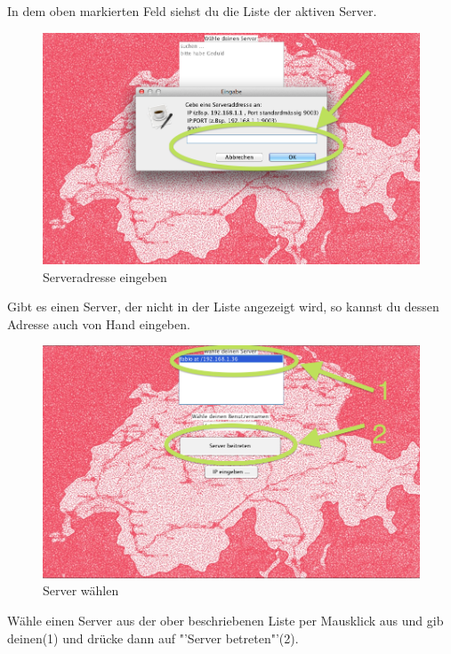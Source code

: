 \documentclass[ngerman, 12pt, pdftex]{scrartcl}[2006/07/30]
\begin{document}
In dem oben markierten Feld siehst du die Liste der aktiven Server.

\newpage 

\begin{figure}[h]
\centering
\includegraphics[scale=0.3]{starten/IP_manuell_eingeben.png}
\caption{Serveradresse eingeben}
\end{figure}

Gibt es einen Server, der nicht in der Liste angezeigt wird, so kannst du dessen Adresse auch von
Hand eingeben.


\begin{figure}[h]
\centering
\includegraphics[scale=0.3]{starten/server_waehlen.png}
\caption{Server w\"{a}hlen}
\end{figure}

W\"{a}hle einen Server aus der ober beschriebenen Liste per Mausklick aus und gib deinen(1) und dr\"{u}cke dann auf "'Server betreten"'(2).

\newpage
\end{document}
